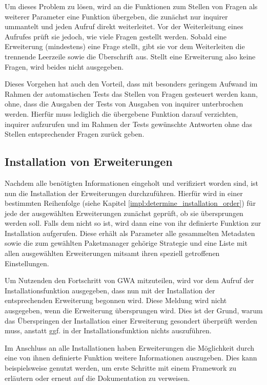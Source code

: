 Um dieses Problem zu lösen, wird an die Funktionen zum Stellen von Fragen als weiterer Parameter eine Funktion übergeben, die zunächst nur inquirer ummantelt und jeden Aufruf direkt weiterleitet. Vor der Weiterleitung eines Aufrufes prüft sie jedoch, wie viele Fragen gestellt werden. Sobald eine Erweiterung (mindestens) eine Frage stellt, gibt sie vor dem Weiterleiten die trennende Leerzeile sowie die Überschrift aus. Stellt eine Erweiterung also keine Fragen, wird beides nicht ausgegeben.

Dieses Vorgehen hat auch den Vorteil, dass mit besonders geringem Aufwand im Rahmen der automatischen Tests das Stellen von Fragen gesteuert werden kann, ohne, dass die Ausgaben der Tests von Ausgaben von inquirer unterbrochen werden. Hierfür muss lediglich die übergebene Funktion darauf verzichten, inquirer aufzurufen und im Rahmen der Tests gewünschte Antworten ohne das Stellen entsprechender Fragen zurück geben.

\subsection{Installation von Erweiterungen}
Nachdem alle benötigten Informationen eingeholt und verifiziert worden sind, ist nun die Installation der Erweiterungen durchzuführen. Hierfür wird in einer bestimmten Reihenfolge (siehe Kapitel \ref{impl:determine_installation_order}) für jede der ausgewählten Erweiterungen zunächst geprüft, ob sie übersprungen werden soll. Falls dem nicht so ist, wird dann eine von ihr definierte Funktion zur Installation aufgerufen. Diese erhält als Parameter alle gesammelten Metadaten sowie die zum gewählten Paketmanager gehörige Strategie und eine Liste mit allen ausgewählten Erweiterungen mitsamt ihren speziell getroffenen Einstellungen.

Um Nutzenden den Fortschritt von \gls{GWA} mitzuteilen, wird vor dem Aufruf der Installationsfunktion ausgegeben, dass nun mit der Installation der entsprechenden Erweiterung begonnen wird. Diese Meldung wird nicht ausgegeben, wenn die Erweiterung übersprungen wird. Dies ist der Grund, warum das Überspringen der Installation einer Erweiterung gesondert überprüft werden muss, anstatt ggf. in der Installationsfunktion nichts auszuführen.

Im Anschluss an alle Installationen haben Erweiterungen die Möglichkeit durch eine von ihnen definierte Funktion weitere Informationen auszugeben. Dies kann beispielsweise genutzt werden, um erste Schritte mit einem Framework zu erläutern oder erneut auf die Dokumentation zu verweisen.

